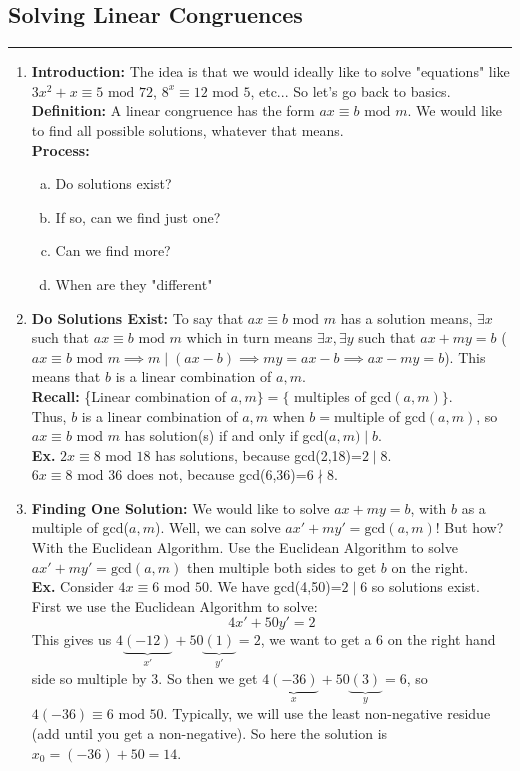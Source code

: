 \documentclass[class=article, crop=false]{standalone}
\begin{document}
\subsection{Solving Linear Congruences}
\rule{\textwidth}{1pt}
\begin{enumerate}[1.]
	\item \textbf{Introduction:} The idea is that we would ideally like to solve "equations" like
	$3x^2+x\equiv 5\mbox{ mod }72$, $8^x\equiv 12\mbox{ mod }5$, etc... So let's go back to basics.\\
	\textbf{Definition:} A linear congruence has the form $ax\equiv b\mbox{ mod }m$. We would like to
	find all possible solutions, whatever that means.\\
	\textbf{Process:}
	\begin{enumerate}[(a)]
		\item Do solutions exist?
		\item If so, can we find just one?
		\item Can we find more?
		\item When are they "different"
	\end{enumerate}
	
	\item \textbf{Do Solutions Exist:} To say that $ax\equiv b\mbox{ mod }m$ has a solution means,
	$\exists x$ such that $ax\equiv b\mbox{ mod }m$ which in turn means $\exists x, \exists y$ such
	that $ax+my=b$ ($ax\equiv b\mbox{ mod }m \implies m \mid (ax-b)\implies my=ax-b \implies ax-my=b$).
	This means that $b$ is a linear combination of $a,m$.\\
	\textbf{Recall:} \{Linear combination of $a,m\} = \{$ multiples of gcd$(a,m)\}$.\\
	Thus, $b$ is a linear combination of $a,m$ when $b=$multiple of gcd$(a,m)$, so 
	$ax\equiv b\mbox{ mod }m$ has solution(s) if and only if gcd($a,m)\mid b$.\\
	\textbf{Ex.} $2x\equiv 8\mbox{ mod }18$ has solutions, because gcd(2,18)=$2\mid8$.\\
	$6x\equiv 8\mbox{ mod }36$ does not, because gcd(6,36)=$6\nmid 8$.
	
	\item \textbf{Finding One Solution:} We would like to solve $ax+my=b$, with $b$ as a multiple of
	gcd($a,m$). Well, we can solve $ax'+my'=\mbox{gcd}(a,m)$! But how? With the Euclidean Algorithm.
	Use the Euclidean Algorithm to solve $ax'+my'=\mbox{gcd}(a,m)$ then multiple both sides to get $b$ on the right.\\
	\textbf{Ex.} Consider $4x\equiv 6\mbox{ mod }50$. We have gcd(4,50)=$2\mid 6$ so solutions exist.
	First we use the Euclidean Algorithm to solve: $$4x'+50y'=2$$
	This gives us $4 \underbrace{(-12)}_{x'}+50\underbrace{(1)}_{y'}=2$, we want to get a $6$ on the right hand side so multiple by $3$.
	So then we get $4 \underbrace{(-36)}_{x}+50\underbrace{(3)}_{y}=6$, so $4(-36)\equiv 6\mbox{ mod }50$.
	Typically, we will use the least non-negative residue (add until you get a non-negative). So here
	the solution is $x_0 = (-36)+50 = 14$.
	

\end{enumerate}
\end{document}
